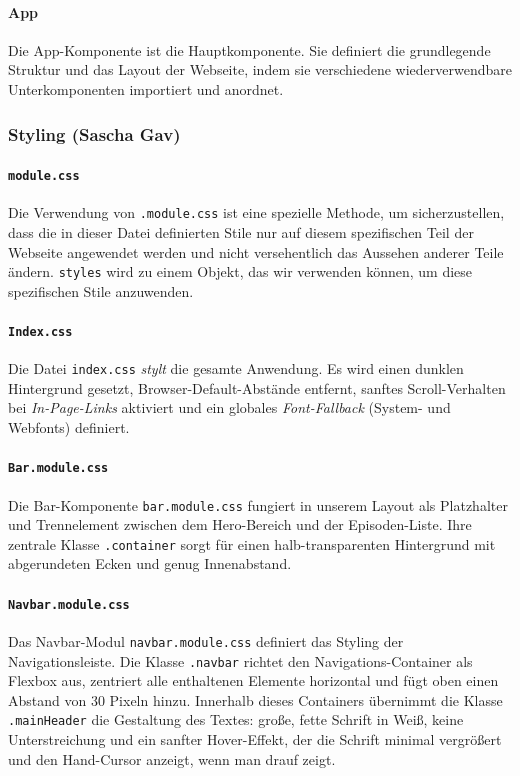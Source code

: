 \documentclass{article}
\begin{document}
\paragraph{App}
Die App-Komponente ist die Hauptkomponente. Sie definiert die grundlegende Struktur und das Layout der Webseite, indem sie verschiedene wiederverwendbare Unterkomponenten importiert und anordnet.

\subsubsection{Styling \small{(Sascha Gav)}}
\paragraph{\texttt{module.css}}
Die Verwendung von \texttt{.module.css} ist eine spezielle Methode, um sicherzustellen, dass die in dieser Datei definierten Stile nur auf diesem spezifischen Teil der Webseite angewendet werden und nicht versehentlich das Aussehen anderer Teile ändern. \texttt{styles} wird zu einem Objekt, das wir verwenden können, um diese spezifischen Stile anzuwenden.

\paragraph{\texttt{Index.css}}
\begin{sloppypar}
Die Datei \texttt{index.css} \textit{stylt} die gesamte Anwendung. Es wird einen dunklen Hintergrund gesetzt, Browser-Default-Abstände entfernt, sanftes Scroll-Verhalten bei \textit{In-Page-Links} aktiviert und ein globales \textit{Font-Fallback} (System- und Webfonts) definiert.
\end{sloppypar}

\paragraph{\texttt{Bar.module.css}}
Die Bar-Komponente \texttt{bar.module.css} fungiert in unserem Layout als Platzhalter und Trennelement zwischen dem Hero-Bereich und der Episoden-Liste. Ihre zentrale Klasse \texttt{.container} sorgt für einen halb-transparenten Hintergrund mit abgerundeten Ecken und genug Innenabstand.

\paragraph{\texttt{Navbar.module.css}}
Das Navbar-Modul \texttt{navbar.module.css} definiert das Styling der Navigationsleiste. Die Klasse \texttt{.navbar} richtet den Navigations-Container als Flexbox aus, zentriert alle enthaltenen Elemente horizontal und fügt oben einen Abstand von 30 Pixeln hinzu. Innerhalb dieses Containers übernimmt die Klasse \texttt{.mainHeader} die Gestaltung des Textes: große, fette Schrift in Weiß, keine Unterstreichung und ein sanfter Hover-Effekt, der die Schrift minimal vergrößert und den Hand-Cursor anzeigt, wenn man drauf zeigt.
\end{document}
